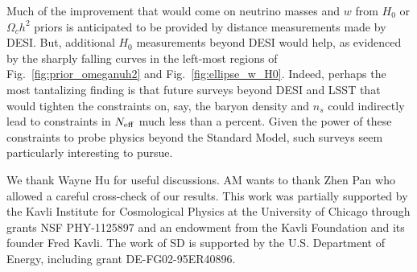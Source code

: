 \documentclass[aps,prd,reprint,superscriptaddress]{revtex4-1}
\newcommand{\reffig}[1]{Fig.~\ref{fig:#1}}
\begin{document}
Much of the improvement that would come on neutrino masses and $w$ from $H_0$ or $\Omega_ch^2$ priors is anticipated to be provided by distance measurements made by DESI. But, additional $H_0$ measurements beyond DESI would help, as evidenced by the sharply falling curves in the left-most regions of \reffig{prior_omeganuh2} and \reffig{ellipse_w_H0}. Indeed, perhaps the most tantalizing finding is that future surveys beyond DESI and LSST that would tighten the constraints on, say, the baryon density and $n_s$ could indirectly lead to constraints in $N_{\rm eff}$ much less than a percent. Given the power of these constraints to probe physics beyond the Standard Model, such surveys seem particularly interesting to pursue.


\begin{acknowledgments}
We thank Wayne Hu for useful discussions. AM wants to thank Zhen Pan who allowed a careful cross-check of our results.
This work was partially supported by the Kavli Institute for Cosmological Physics at the University of Chicago through grants NSF PHY-1125897 and an endowment from the Kavli Foundation and its founder Fred Kavli.
The work of SD is supported by the U.S. Department of Energy, including grant DE-FG02-95ER40896.
\end{acknowledgments}


\end{document}
